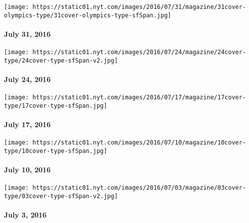 \href{http://www.nytimes.com/indexes/2016/07/31/magazine/index.html}{}

\texttt{[image: https://static01.nyt.com/images/2016/07/31/magazine/31cover-olympics-type/31cover-olympics-type-sfSpan.jpg]}

\hypertarget{july-31-2016}{%
\paragraph{July 31, 2016}\label{july-31-2016}}

\href{http://www.nytimes.com/indexes/2016/07/24/magazine/index.html}{}

\texttt{[image: https://static01.nyt.com/images/2016/07/24/magazine/24cover-type/24cover-type-sfSpan-v2.jpg]}

\hypertarget{july-24-2016}{%
\paragraph{July 24, 2016}\label{july-24-2016}}

\href{http://www.nytimes.com/indexes/2016/07/17/magazine/index.html}{}

\texttt{[image: https://static01.nyt.com/images/2016/07/17/magazine/17cover-type/17cover-type-sfSpan.jpg]}

\hypertarget{july-17-2016}{%
\paragraph{July 17, 2016}\label{july-17-2016}}

\href{http://www.nytimes.com/indexes/2016/07/10/magazine/index.html}{}

\texttt{[image: https://static01.nyt.com/images/2016/07/10/magazine/10cover-type/10cover-type-sfSpan.jpg]}

\hypertarget{july-10-2016}{%
\paragraph{July 10, 2016}\label{july-10-2016}}

\href{http://www.nytimes.com/indexes/2016/07/03/magazine/index.html}{}

\texttt{[image: https://static01.nyt.com/images/2016/07/03/magazine/03cover-type/03cover-type-sfSpan-v2.jpg]}

\hypertarget{july-3-2016}{%
\paragraph{July 3, 2016}\label{july-3-2016}}

